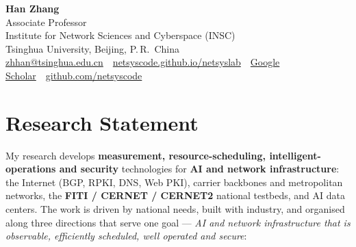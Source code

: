 \documentclass[11pt]{article}
\newcommand{\cn}[1]{#1}
\begin{document}
\begin{center}
  {\Huge\bfseries\color{accent} Han Zhang}\quad{\LARGE\bfseries\color{accent}\cn{张\,晗}}\\[5pt]
  {\large Associate Professor}\\[3pt]
  Institute for Network Sciences and Cyberspace (INSC)\\
  Tsinghua University, Beijing, P.\,R.\ China\\[5pt]
  \small
  \href{mailto:zhhan@tsinghua.edu.cn}{zhhan@tsinghua.edu.cn}\ \textbullet\
  \href{https://netsyscode.github.io/netsyslab/}{netsyscode.github.io/netsyslab}\ \textbullet\
  \href{https://scholar.google.com/citations?user=2_wPPU0AAAAJ}{Google Scholar}\ \textbullet\
  \href{https://github.com/netsyscode}{github.com/netsyscode}
\end{center}
\vspace{2pt}

\section*{Research Statement}
\noindent
My research develops \textbf{measurement, resource-scheduling, intelligent-operations
and security} technologies for \textbf{AI and network infrastructure}: the Internet (BGP,
RPKI, DNS, Web PKI), carrier backbones and metropolitan networks, the
\textbf{FITI / CERNET / CERNET2} national testbeds, and AI data centers. The work is
driven by national needs, built with industry, and organised along three directions that
serve one goal --- \emph{AI and network infrastructure that is observable, efficiently
scheduled, well operated and secure}:
\end{document}
